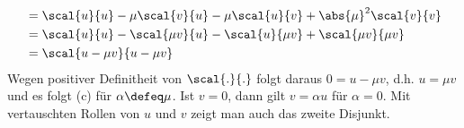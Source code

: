 \begin{exercisePage}[Hilberträume][10.5/15]
\begin{description}
\begin{align*}
		&= \scal{u}{u} - \mu \scal{v}{u} - \mu \scal{u}{v} + \abs{\mu}^2 \scal{v}{v} \\
		&= \scal{u}{u} - \scal{\mu v}{u} - \scal{u}{\mu v} + \scal{\mu v}{\mu v} \\
		&= \scal{u - \mu v}{u - \mu  v}
	\end{align*}
	Wegen positiver Definitheit von $\scal{.}{.}$ folgt daraus $0 = u - \mu  v$, d.h. $u = \mu v$ und es folgt (c) für $\alpha \defeq \mu$.
	Ist $v = 0$, dann gilt $v = \alpha u$ für $\alpha = 0$. Mit vertauschten Rollen von $u$ und $v$ zeigt man auch das zweite Disjunkt.
\end{description}
\end{exercisePage}